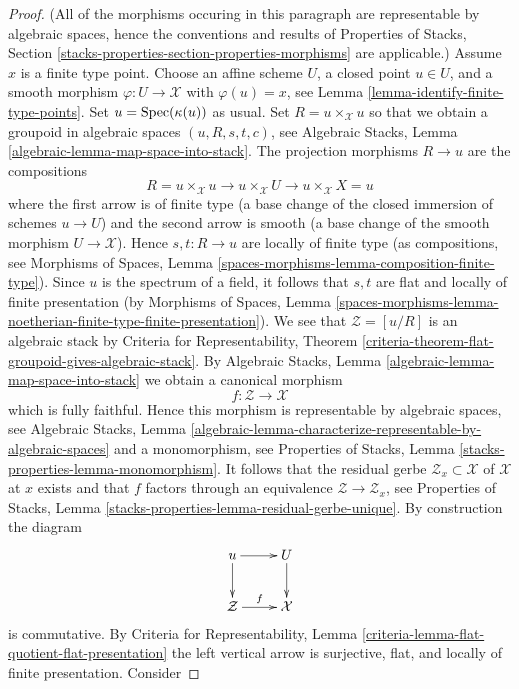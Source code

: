 \begin{proof}
(All of the morphisms occuring in this paragraph are representable
by algebraic spaces, hence the conventions and results of
Properties of Stacks,
Section \ref{stacks-properties-section-properties-morphisms}
are applicable.)
Assume $x$ is a finite type point. Choose an affine scheme $U$,
a closed point $u \in U$, and a smooth morphism $\varphi : U \to \mathcal{X}$
with $\varphi(u) = x$, see
Lemma \ref{lemma-identify-finite-type-points}.
Set $u = \mathop{\rm Spec}(\kappa(u))$ as usual. Set $R = u \times_\mathcal{X} u$
so that we obtain a groupoid in algebraic spaces
$(u, R, s, t, c)$, see
Algebraic Stacks, Lemma \ref{algebraic-lemma-map-space-into-stack}.
The projection morphisms $R \to u$ are the compositions
$$
R = u \times_\mathcal{X} u \to
u \times_\mathcal{X} U \to
u \times_\mathcal{X} X = u
$$
where the first arrow is of finite type (a base change of the closed
immersion of schemes $u \to U$) and the second arrow is smooth (a base
change of the smooth morphism $U \to \mathcal{X}$). Hence
$s, t : R \to u$ are locally of finite type (as compositions, see
Morphisms of Spaces,
Lemma \ref{spaces-morphisms-lemma-composition-finite-type}).
Since $u$ is the spectrum of a field, it follows that
$s, t$ are flat and locally of finite presentation (by
Morphisms of Spaces, Lemma
\ref{spaces-morphisms-lemma-noetherian-finite-type-finite-presentation}).
We see that $\mathcal{Z} = [u/R]$ is an algebraic stack by
Criteria for Representability,
Theorem \ref{criteria-theorem-flat-groupoid-gives-algebraic-stack}.
By
Algebraic Stacks, Lemma \ref{algebraic-lemma-map-space-into-stack}
we obtain a canonical morphism
$$
f : \mathcal{Z} \longrightarrow \mathcal{X}
$$
which is fully faithful. Hence this morphism is representable by
algebraic spaces, see
Algebraic Stacks, Lemma
\ref{algebraic-lemma-characterize-representable-by-algebraic-spaces}
and a monomorphism, see
Properties of Stacks, Lemma \ref{stacks-properties-lemma-monomorphism}.
It follows that the residual gerbe $\mathcal{Z}_x \subset \mathcal{X}$
of $\mathcal{X}$ at $x$ exists and that $f$ factors through an
equivalence $\mathcal{Z} \to \mathcal{Z}_x$, see
Properties of Stacks, Lemma
\ref{stacks-properties-lemma-residual-gerbe-unique}.
By construction the diagram
$$
\xymatrix{
u \ar[d] \ar[r] & U \ar[d] \\
\mathcal{Z} \ar[r]^f & \mathcal{X}
}
$$
is commutative. By
Criteria for Representability,
Lemma \ref{criteria-lemma-flat-quotient-flat-presentation}
the left vertical arrow is surjective, flat, and locally of finite
presentation. Consider

\end{proof}
